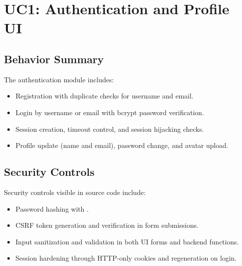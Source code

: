\section{UC1: Authentication and Profile UI}



\subsection{Behavior Summary}

The authentication module includes:
\begin{itemize}
    \item Registration with duplicate checks for username and email.
    \item Login by username or email with bcrypt password verification.
    \item Session creation, timeout control, and session hijacking checks.
    \item Profile update (name and email), password change, and avatar upload.
\end{itemize}

\subsection{Security Controls}

Security controls visible in source code include:
\begin{itemize}
    \item Password hashing with .
    \item CSRF token generation and verification in form submissions.
    \item Input sanitization and validation in both UI forms and backend functions.
    \item Session hardening through HTTP-only cookies and regeneration on login.
\end{itemize}

